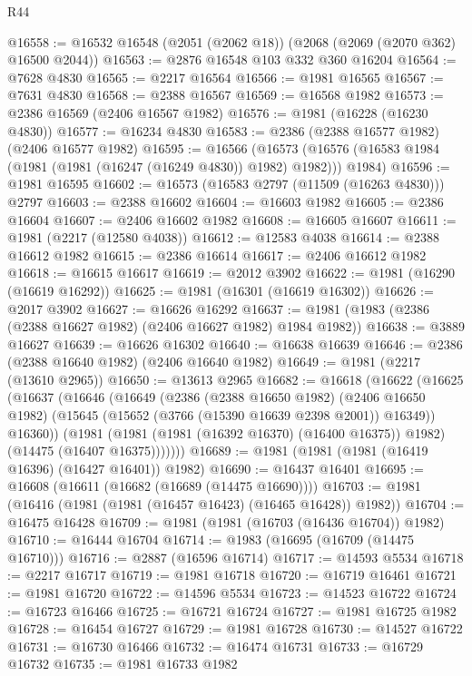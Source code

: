 \begin{lexlean}{R44}
\begin{coremodule}
@16558 := @16532 @16548 (@2051 (@2062 @18)) (@2068 (@2069 (@2070 @362) @16500 @2044))
@16563 := @2876 @16548 @103 @332 @360 @16204
@16564 := @7628 @4830
@16565 := @2217 @16564
@16566 := @1981 @16565
@16567 := @7631 @4830
@16568 := @2388 @16567
@16569 := @16568 @1982
@16573 := @2386 @16569 (@2406 @16567 @1982)
@16576 := @1981 (@16228 (@16230 @4830))
@16577 := @16234 @4830
@16583 := @2386 (@2388 @16577 @1982) (@2406 @16577 @1982)
@16595 := @16566
    (@16573 (@16576 (@16583 @1984 (@1981 (@1981 (@16247 (@16249 @4830)) @1982) @1982))) @1984)
@16596 := @1981 @16595
@16602 := @16573 (@16583 @2797 (@11509 (@16263 @4830))) @2797
@16603 := @2388 @16602
@16604 := @16603 @1982
@16605 := @2386 @16604
@16607 := @2406 @16602 @1982
@16608 := @16605 @16607
@16611 := @1981 (@2217 (@12580 @4038))
@16612 := @12583 @4038
@16614 := @2388 @16612 @1982
@16615 := @2386 @16614
@16617 := @2406 @16612 @1982
@16618 := @16615 @16617
@16619 := @2012 @3902
@16622 := @1981 (@16290 (@16619 @16292))
@16625 := @1981 (@16301 (@16619 @16302))
@16626 := @2017 @3902
@16627 := @16626 @16292
@16637 := @1981 (@1983 (@2386 (@2388 @16627 @1982) (@2406 @16627 @1982) @1984 @1982))
@16638 := @3889 @16627
@16639 := @16626 @16302
@16640 := @16638 @16639
@16646 := @2386 (@2388 @16640 @1982) (@2406 @16640 @1982)
@16649 := @1981 (@2217 (@13610 @2965))
@16650 := @13613 @2965
@16682 := @16618
    (@16622
      (@16625
        (@16637
          (@16646
            (@16649
              (@2386
                (@2388 @16650 @1982)
                (@2406 @16650 @1982)
                (@15645 (@15652 (@3766 (@15390 @16639 @2398 @2001)) @16349))
                @16360))
            (@1981
              (@1981 (@1981 (@16392 @16370) (@16400 @16375)) @1982)
              (@14475 (@16407 @16375)))))))
@16689 := @1981 (@1981 (@1981 (@16419 @16396) (@16427 @16401)) @1982)
@16690 := @16437 @16401
@16695 := @16608 (@16611 (@16682 (@16689 (@14475 @16690))))
@16703 := @1981 (@16416 (@1981 (@1981 (@16457 @16423) (@16465 @16428)) @1982))
@16704 := @16475 @16428
@16709 := @1981 (@1981 (@16703 (@16436 @16704)) @1982)
@16710 := @16444 @16704
@16714 := @1983 (@16695 (@16709 (@14475 @16710)))
@16716 := @2887 (@16596 @16714)
@16717 := @14593 @5534
@16718 := @2217 @16717
@16719 := @1981 @16718
@16720 := @16719 @16461
@16721 := @1981 @16720
@16722 := @14596 @5534
@16723 := @14523 @16722
@16724 := @16723 @16466
@16725 := @16721 @16724
@16727 := @1981 @16725 @1982
@16728 := @16454 @16727
@16729 := @1981 @16728
@16730 := @14527 @16722
@16731 := @16730 @16466
@16732 := @16474 @16731
@16733 := @16729 @16732
@16735 := @1981 @16733 @1982

\end{coremodule}
\end{lexlean}
